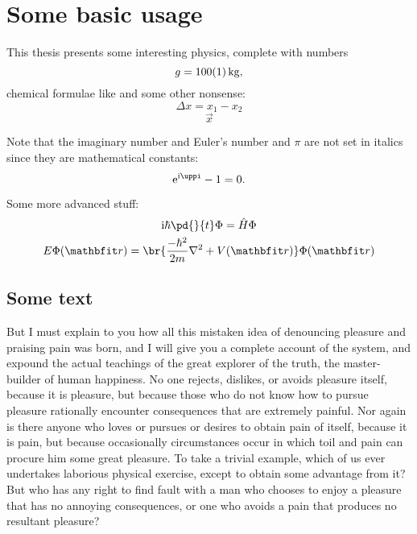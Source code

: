 \chapter{Some basic usage}\label{ch:introduction}

This thesis presents some interesting physics, complete with numbers
\begin{equation}
	g = \SI{100+-1}{kg}\text{,}
\end{equation}
chemical formulae like  and some other nonsense:
\begin{equation}
	\Delta x = x_1 - x_2
\end{equation}
\begin{equation}
	\vec{x}
\end{equation}

Note that the imaginary number and Euler's number and $\pi$ are not set in italics since they are mathematical constants:
\begin{equation}
	\e^{\i\pi} - 1 = 0\text{.}
\end{equation}

Some more advanced stuff:
\begin{subequations}\label{eq:schroedinger}
	\begin{gather}
		\i \hbar \pd{}{t}\Phi = \op{H}\Phi\\
		E\Phi(\vec{r}) = \br{\frac{-\hbar^2}{2m} \nabla^2 + V(\vec{r}) } \Phi(\vec{r})
	\end{gather}
\end{subequations}

\section{Some text}
But I must explain to you how all this mistaken idea of denouncing pleasure and praising pain was born, and I will give you a complete account of the system, and expound the actual teachings of the great explorer of the truth, the master-builder of human happiness. No one rejects, dislikes, or avoids pleasure itself, because it is pleasure, but because those who do not know how to pursue pleasure rationally encounter consequences that are extremely painful. Nor again is there anyone who loves or pursues or desires to obtain pain of itself, because it is pain, but because occasionally circumstances occur in which toil and pain can procure him some great pleasure. To take a trivial example, which of us ever undertakes laborious physical exercise, except to obtain some advantage from it? But who has any right to find fault with a man who chooses to enjoy a pleasure that has no annoying consequences, or one who avoids a pain that produces no resultant pleasure?

